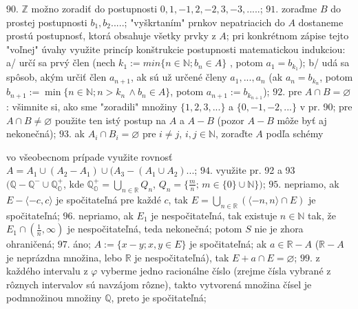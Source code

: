 $\boxed{90.}$
$ \mathbb{Z} $ možno zoradiť do postupnosti $ 0,1,-1,2,-2,3,-3,..... $;
$\boxed{91.}$
zoraďme $ B $ do prostej postupnosti $ b_{1}, b_{2}..... $; "vyškrtaním" prnkov nepatriacich do $ A $ dostaneme prostú postupnosť, ktorá obsahuje všetky prvky z $ A $; pri konkrétnom zápise tejto "voľnej" úvahy využite princíp konštrukcie postupnosti matematickou indukciou: a/ určí sa prvý člen (nech $ k_{1}:= min \lbrace n \in \mathbb{N} ;  b_{n} \in A \rbrace $ , potom $ a_{1}=b_{k_{1}} $); b/ udá sa spôsob, akým určiť člen $ a_{n+1} $, ak sú už určené členy $ a_{1},...,a_{n} $ (ak $ a_{n}=b_{k_{n}} $, potom $ b_{n+1}:= \min \lbrace n \in \mathbb{N}; n>k_{n} \, \land b_{n} \in A \rbrace $, potom $ a_{n+1}:=b_{k_{n+1}} $);
$\boxed{92.}$
pre $ A\cap B=\varnothing $: všimnite si, ako sme "zoradili" množiny $ \lbrace1,2,3,...\rbrace $ a $\lbrace 0,-1,-2,...\rbrace $ v pr. 90; pre $ A \cap B \ne \varnothing $ použite ten istý postup na $ A $ a $ A-B $ (pozor  $ A-B $ môže byť aj nekonečná);
$\boxed{93.}$
ak $ A_{i}\cap B_{i}=\varnothing $ pre $ i \ne j $, $ i,j \in \mathbb{N} $, zoraďte $ A $ podľa schémy

\newpage


vo všeobecnom prípade využite rovnosť $ A=A_{1} \cup (A_{2}-A_{1}) \cup (A_{3}- (A_{1}\cup A_{2})... $;
$\boxed{94.}$
využite pr. 92 a 93 $ ( \mathbb{Q}-\mathbb{Q^{-} \cup \mathbb{Q^{+}_{O}}} $, kde $\mathbb{Q^{+}_{O}} =\bigcup\limits_{n \in \mathbb{R}} Q_{n} $, $  Q_{n}=\lbrace \frac{m}{n}; \, m\in \lbrace 0 \rbrace \cup \mathbb{N}\rbrace )$; 
$\boxed{95.}$
nepriamo, ak $ E-\langle-c,c\rangle $ je spočitateľná pre každé $ c $, tak $ E= \bigcup\limits_{n \in \mathbb{R}} (\langle-n,n\rangle \cap E)$  je spočitateľná;
$\boxed{96.}$
nepriamo, ak $ E_{1} $ je nespočitateľná, tak existuje $ n \in \mathbb{N} $ tak, že $ E_{1} \cap ( \frac{1}{n}, \infty) $ je nespočitateľná, teda nekonečná; potom $ S $ nie je zhora ohraničená;
$\boxed{97.}$
áno; $ A:= \lbrace x-y;  x,y \in E \rbrace $ je spočitateľná; ak $ a \in \mathbb{R}-A $   ($ \mathbb{R}-A $ je neprázdna množina, lebo $ \mathbb{R} $ je nespočitateľná), tak $ E+a \cap E = \varnothing $;
$\boxed{99.}$
z každého intervalu z $ \varphi $ vyberme jedno racionálne číslo (zrejme čísla vybrané z rôznych intervalov sú navzájom rôzne), takto vytvorená množina čísel je podmnožinou množiny $ \mathbb{Q} $, preto je spočitateľná;